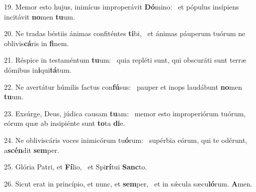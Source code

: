 19. Memor esto hujus, inimícus improperávit \textbf{Dó}mino: \ast\  et pópulus insípiens incitávit \textbf{no}men \textbf{tu}um.\

20. Ne tradas béstiis ánimas confiténtes \textbf{ti}bi, \ast\  et ánimas páuperum tuórum ne oblivis\textbf{cá}ris in \textbf{fi}nem.\

21. Réspice in testaméntum \textbf{tu}um: \ast\  quia repléti sunt, qui obscuráti sunt terræ dómibus in\textbf{i}qui\textbf{tá}tum.\

22. Ne avertátur húmilis factus con\textbf{fú}sus: \ast\  pauper et inops laudábunt \textbf{no}men \textbf{tu}um.\

23. Exsúrge, Deus, júdica causam \textbf{tu}am: \ast\  memor esto improperiórum tuórum, eórum quæ ab insipiénte sunt \textbf{to}ta \textbf{di}e.\

24. Ne obliviscáris voces inimicórum tu\textbf{ó}rum: \ast\  supérbia eórum, qui te odérunt, a\textbf{scén}dit \textbf{sem}per.\

25. Glória Patri, et \textbf{Fí}lio, \ast\  et Spi\textbf{rí}tui \textbf{Sanc}to.\

26. Sicut erat in princípio, et nunc, et \textbf{sem}per, \ast\  et in sǽcula sæcu\textbf{ló}rum. \textbf{A}men.\


